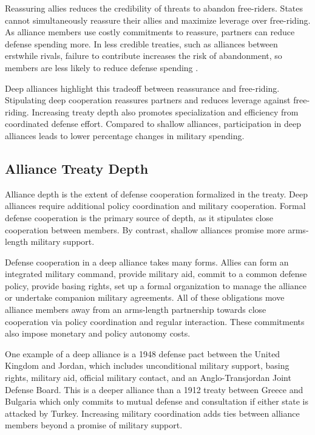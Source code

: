 \documentclass[12pt]{article}
\begin{document}
Reassuring allies reduces the credibility of threats to abandon free-riders. 
States cannot simultaneously reassure their allies and maximize leverage over free-riding. 
As alliance members use costly commitments to reassure, partners can reduce defense spending more. 
In less credible treaties, such as alliances between erstwhile rivals, failure to contribute increases the risk of abandonment, so members are less likely to reduce defense spending \citep{NiouZeigler2019}. 


Deep alliances highlight this tradeoff between reassurance and free-riding. 
Stipulating deep cooperation reassures partners and reduces leverage against free-riding. 
Increasing treaty depth also promotes specialization and efficiency from coordinated defense effort.
Compared to shallow alliances, participation in deep alliances leads to lower percentage changes in military spending. 



\subsection*{Alliance Treaty Depth} 


Alliance depth is the extent of defense cooperation formalized in the treaty. 
Deep alliances require additional policy coordination and military cooperation. 
Formal defense cooperation is the primary source of depth, as it stipulates close cooperation between members.
By contrast, shallow alliances promise more arms-length military support. 


Defense cooperation in a deep alliance takes many forms. 
Allies can form an integrated military command, provide military aid, commit to a common defense policy, provide basing rights, set up a formal organization to manage the alliance or undertake companion military agreements. 
All of these obligations move alliance members away from an arms-length partnership towards close cooperation via policy coordination and regular interaction. 
These commitments also impose monetary and policy autonomy costs. 

 
One example of a deep alliance is a 1948 defense pact between the United Kingdom and Jordan, which includes unconditional military support, basing rights, military aid, official military contact, and an Anglo-Transjordan Joint Defense Board.  
This is a deeper alliance than a 1912 treaty between Greece and Bulgaria which only commits to mutual defense and consultation if either state is attacked by Turkey. 
Increasing military coordination adds ties between alliance members beyond a promise of military support.
\end{document}
